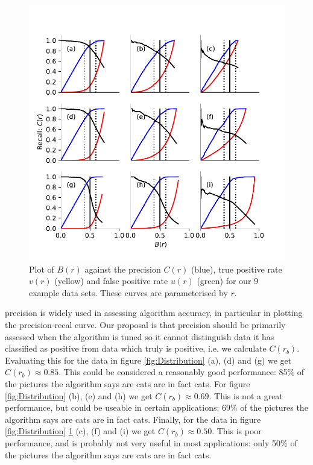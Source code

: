 \documentclass[preprint,12pt]{article}
\begin{document}
\begin{figure}[t]
\centering
\includegraphics[scale=1]{Figures/Balance.pdf}
\caption{Plot of $B(r)$ against the precision $C(r)$ (blue), true positive rate $v(r)$ (yellow) and false positive rate $u(r)$ (green) for our 9 example data sets. These curves are parameterised by $r$. }
\label{fig:balance}
\end{figure}

precision is widely used in assessing algorithm accuracy, in particular in plotting the precision-recal curve. Our proposal is that precision should be primarily assessed when the algorithm is tuned so it cannot distinguish data it has classified as positive from data which truly is positive, i.e. we calculate $C(r_b)$. Evaluating this for the data in figure \ref{fig:Distribution} (a), (d) and (g) we get $C(r_b) \approx  0.85$. This could be considered a reasonably good performance: 85\% of the pictures the algorithm says are cats are in fact cats. For figure \ref{fig:Distribution}  (b), (e) and (h) we get $C(r_b) \approx 0.69$. This is not a great performance, but could be useable in certain applications: 69\% of the pictures the algorithm says are cats are in fact cats. Finally, for the data in figure \ref{fig:Distribution} \ref{fig:balance} (c), (f) and (i) we get $C(r_b) \approx  0.50$. This is poor performance, and is probably not very useful in most applications: only 50\% of the pictures the algorithm says are cats are in fact cats. 
\end{document}
